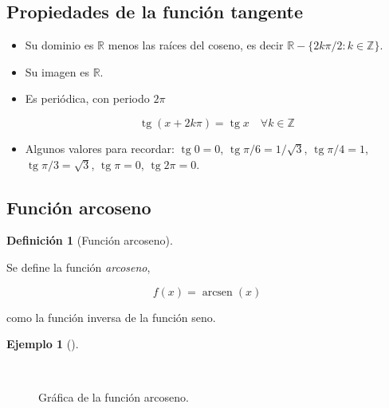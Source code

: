 \documentclass[
  a4paper,
]{scrreport}
\theoremstyle{plain}
\theoremstyle{plain}
\theoremstyle{definition}
\newtheorem{definition}{Definición}[chapter]
\theoremstyle{plain}
\theoremstyle{definition}
\newtheorem{example}{Ejemplo}[chapter]
\theoremstyle{remark}
\begin{document}
\hypertarget{propiedades-de-la-funciuxf3n-tangente}{%
\subsection{Propiedades de la función
tangente}\label{propiedades-de-la-funciuxf3n-tangente}}

\begin{itemize}
\item
  Su dominio es \(\mathbb{R}\) menos las raíces del coseno, es decir
  \(\mathbb{R}-\{2k\pi/2: k\in \mathbb{Z}\}\).
\item
  Su imagen es \(\mathbb{R}\).
\item
  Es periódica, con periodo \(2\pi\)

  \[\operatorname{tg} (x+2k\pi)= \operatorname{tg} x\quad \forall k\in \mathbb{Z}\]
\item
  Algunos valores para recordar: \(\operatorname{tg} 0=0\),
  \(\operatorname{tg} \pi/6= 1/\sqrt{3}\),
  \(\operatorname{tg} \pi/4=1\), \(\operatorname{tg} \pi/3= \sqrt{3}\),
  \(\operatorname{tg} \pi =0\), \(\operatorname{tg} 2\pi=0\).
\end{itemize}

\hypertarget{funciuxf3n-arcoseno}{%
\subsection{Función arcoseno}\label{funciuxf3n-arcoseno}}

\leavevmode{}%
\begin{definition}[Función arcoseno]\label{def-funcion-arcoseno}

Se define la función \emph{arcoseno},

\[f(x)=\operatorname{arcsen}(x)\]

como la función inversa de la función seno.

\end{definition}

\leavevmode{}%
\begin{example}[]\label{exm-funcion-arcoseno}

~

\begin{figure}

{\centering 



}

\caption{Gráfica de la función arcoseno.}

\end{figure}

\end{example}
\end{document}

